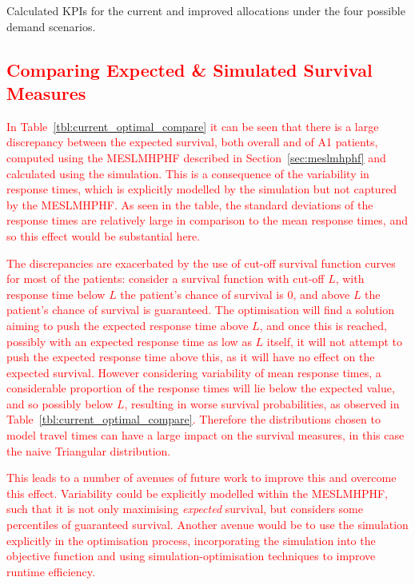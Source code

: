 \documentclass[numbers,webpdf,imaman]{ima-authoring-template}%
\begin{document}
\begin{table}
\resizebox{\textwidth}{!}{%
%
}
\caption{Calculated KPIs for the current and improved allocations under the
four possible demand scenarios.}
\label{tbl:current_optimal_compare}
\end{table}

\textcolor{red}{
\subsection{Comparing Expected \& Simulated Survival Measures}\label{sec:compare_exp_and_sim}
In Table~\ref{tbl:current_optimal_compare} it can be seen that there is a large
discrepancy between the expected survival, both overall and of A1 patients,
computed using the MESLMHPHF described in Section~\ref{sec:meslmhphf} and
calculated using the simulation. This is a consequence of the variability in
response times, which is explicitly modelled by the simulation but not captured
by the MESLMHPHF. As seen in the table, the standard deviations of the response
times are relatively large in comparison to the mean response times, and so this
effect would be substantial here.}

\textcolor{red}{
The discrepancies are exacerbated by the use of cut-off survival function curves
for most of the patients: consider a survival function with cut-off $L$, with
response time below $L$ the patient's chance of survival is 0, and above $L$ the
patient's chance of survival is guaranteed. The optimisation will find a
solution aiming to push the expected response time above $L$, and once this is
reached, possibly with an expected response time as low as $L$ itself, it will
not attempt to push the expected
response time above this, as it will have no effect on the expected survival.
However considering variability of mean response times, a considerable
proportion of the response times will lie below the expected value, and so
possibly below $L$, resulting in worse survival probabilities, as observed in
Table~\ref{tbl:current_optimal_compare}. Therefore the distributions chosen to
model travel times can have a large impact on the survival measures, in this
case the naive Triangular distribution.}

\textcolor{red}{
This leads to a number of avenues of future work to improve this and overcome
this effect. Variability could be explicitly modelled within the MESLMHPHF, such
that it is not only maximising \textit{expected} survival, but considers some
percentiles of guaranteed survival. Another avenue would be to use the
simulation explicitly in the optimisation process, incorporating the simulation
into the objective function and using simulation-optimisation techniques to
improve runtime efficiency.}
\end{document}
